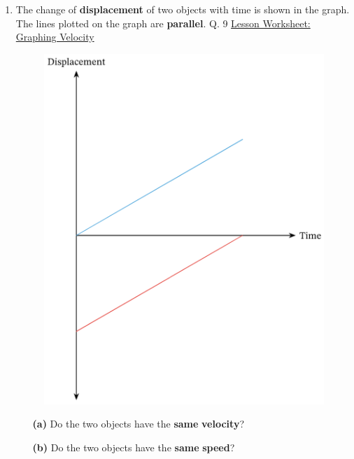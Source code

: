 \documentclass[A4,12pt]{article}
\begin{document}
\begin{enumerate}[label=\bfseries (\arabic*)]
\item The change of \textbf{displacement} of two objects with time is shown in the graph. The lines plotted on the graph are \textbf{parallel}. \cite{Nagwa} Q. 9 \href{https://www.nagwa.com/en/worksheets/715142164735/}{Lesson Worksheet: Graphing Velocity}
%
\begin{figure}[H]
    \centering
    \includegraphics[scale=0.7]{Nagwa_Q9_disp.png}
\end{figure}
%
\begin{itemize}
    \item[\bf (a)] Do the two objects have the \textbf{same} \textbf{velocity}?
    
    \item[\bf (b)] Do the two objects have the \textbf{same} \textbf{speed}?
    

\end{itemize}
\end{enumerate}
\end{document}
